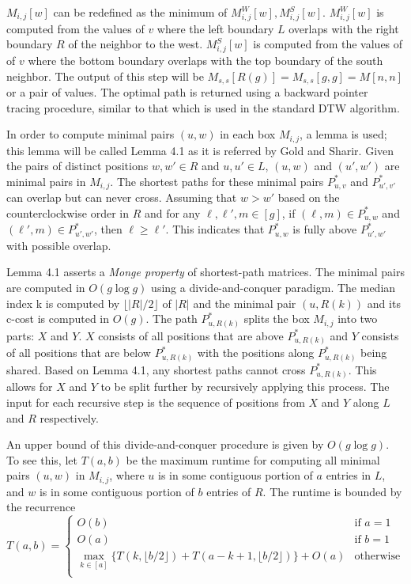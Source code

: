 $M_{i,j}[w]$ can be redefined as the minimum of ${M^W_{i,j}[w], M^S_{i,j}[w]}$. $M^W_{i,j}[w]$ is computed from the values of $v$ where the left boundary $L$ overlaps with the right boundary $R$ of the neighbor to the west. $M^S_{i,j}[w]$ is computed from the values of of $v$ where the bottom boundary overlaps with the top boundary of the south neighbor. The output of this step will be $M_{s,s}[R(g)] = M_{s,s}[g,g] = M[n,n]$ or a pair of values. The optimal path is returned using a backward pointer tracing procedure, similar to that which is used in the standard DTW algorithm.

In order to compute minimal pairs $(u, w)$ in each box $M_{i,j}$, a lemma is used; this lemma will be called Lemma 4.1 as it is referred by Gold and Sharir. Given the pairs of distinct positions $w, w' \in R$ and $u, u' \in L$, $(u, w)$ and $(u', w')$ are minimal pairs in $M_{i,j}$. The shortest paths for these minimal pairs $P^*_{u,v}$ and $P^*_{u',v'}$ can overlap but can never cross. Assuming that $w > w'$ based on the counterclockwise order in $R$ and for any $\ell, \ell', m \in [g]$, if $(\ell, m) \in P^*_{u,w}$ and $(\ell', m) \in P^*_{u',w'}$, then $\ell \ge \ell'$. This indicates that $P^*_{u,w}$ is fully above $P^*_{u',w'}$ with possible overlap.

Lemma 4.1 asserts a \textit{Monge property} of shortest-path matrices. The minimal pairs are computed in $O(g \log{g})$ using a divide-and-conquer paradigm. The median index k is computed by $\lfloor |R|/2\rfloor$ of $|R|$ and the minimal pair $(u, R(k))$  and its c-cost is computed in $O(g)$. The path $P^*_{u, R(k)}$ splits the box $M_{i,j}$ into two parts: $X$ and $Y$. $X$ consists of all positions that are above $P^*_{u, R(k)}$ and $Y$ consists of all positions that are below $P^*_{u, R(k)}$ with the positions along $P^*_{u, R(k)}$ being shared. Based on Lemma 4.1, any shortest paths cannot cross $P^*_{u, R(k)}$. This allows for $X$ and $Y$ to be split further by recursively applying this process. The input for each recursive step is the sequence of positions from $X$ and $Y$ along $L$ and $R$ respectively.

An upper bound of this divide-and-conquer procedure is given by $O(g \log{g})$. To see this, let $T(a,b)$ be the maximum runtime for computing all minimal pairs $(u,w)$ in $M_{i,j}$, where $u$ is in some contiguous portion of $a$ entries in $L$, and $w$ is in some contiguous portion of $b$ entries of $R$. The runtime is bounded by the recurrence
\[
    T(a,b)=\begin{cases}
        O(b)                                                                              & \text{if }a=1    \\[-1.5em]
        O(a)                                                                              & \text{if }b=1    \\[-1.5em]
        \max\limits_{k\in[a]}\{T(k,\lfloor b/2\rfloor)+T(a-k+1,\lfloor b/2\rfloor)\}+O(a) & \text{otherwise} \\
    \end{cases}
\]


